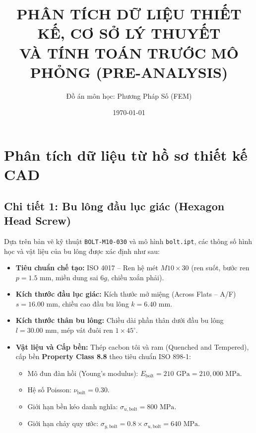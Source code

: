 \documentclass[12pt,a4paper]{article}
\title{\textbf{PHÂN TÍCH DỮ LIỆU THIẾT KẾ, CƠ SỞ LÝ THUYẾT \\ VÀ TÍNH TOÁN TRƯỚC MÔ PHỎNG (PRE-ANALYSIS)}}
\author{Đồ án môn học: Phương Pháp Số (FEM)}
\date{\today}
\begin{document}
\maketitle

\section{Phân tích dữ liệu từ hồ sơ thiết kế CAD}

\subsection{Chi tiết 1: Bu lông đầu lục giác (Hexagon Head Screw)}
Dựa trên bản vẽ kỹ thuật \texttt{BOLT-M10-030} và mô hình \texttt{bolt.ipt}, các thông số hình học và vật liệu của bu lông được xác định như sau:
\begin{itemize}
    \item \textbf{Tiêu chuẩn chế tạo:} ISO 4017 -- Ren hệ mét $M10 \times 30$ (ren suốt, bước ren $p = 1.5\text{ mm}$, miền dung sai $6g$, chiều xoắn phải).
    \item \textbf{Kích thước đầu lục giác:} Kích thước mở miệng (Across Flats -- A/F) $s = 16.00\text{ mm}$, chiều cao đầu bu lông $k = 6.40\text{ mm}$.
    \item \textbf{Kích thước thân bu lông:} Chiều dài phần thân dưới đầu bu lông $l = 30.00\text{ mm}$, mép vát đuôi ren $1 \times 45^\circ$.
    \item \textbf{Vật liệu và Cấp bền:} Thép cacbon tôi và ram (Quenched and Tempered), cấp bền \textbf{Property Class 8.8} theo tiêu chuẩn ISO 898-1:
    \begin{itemize}
        \item Mô đun đàn hồi (Young's modulus): $E_{\text{bolt}} = 210\text{ GPa} = 210,000\text{ MPa}$.
        \item Hệ số Poisson: $\nu_{\text{bolt}} = 0.30$.
        \item Giới hạn bền kéo danh nghĩa: $\sigma_{u,\text{bolt}} = 800\text{ MPa}$.
        \item Giới hạn chảy quy ước: $\sigma_{y,\text{bolt}} = 0.8 \times \sigma_{u,\text{bolt}} = 640\text{ MPa}$.
    \end{itemize}
\end{itemize}
\end{document}
